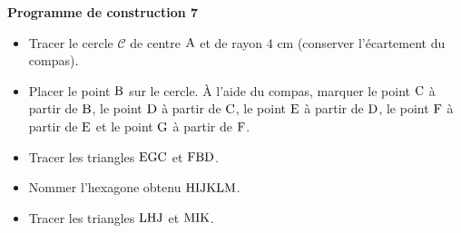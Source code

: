 \documentclass[exercice,a4]{thedocument}%
\begin{document}
%
\noindent\textbf{Programme de construction 7}\par\smallskip\noindent
\begin{itemize}
    \item Tracer le cercle $\mathcal{C}$ de centre $\text{A}$ et de
    rayon $4\text{ cm}$ (conserver l'écartement du compas).
    \item Placer le point $\text{B}$ sur le cercle. À l'aide du
    compas, marquer le point $\text{C}$ à partir de
    $\text{B}$, le point $\text{D}$ à partir de
    $\text{C}$, le point $\text{E}$ à partir de
    $\text{D}$, le point $\text{F}$ à partir de
    $\text{E}$ et le point $\text{G}$ à partir de
    $\text{F}$.
    \item Tracer les triangles $\text{EGC}$ et $\text{FBD}$.
    \item Nommer l'hexagone obtenu $\text{HIJKLM}$.
    \item Tracer les triangles $\text{LHJ}$ et $\text{MIK}$.
\end{itemize}
\end{document}
